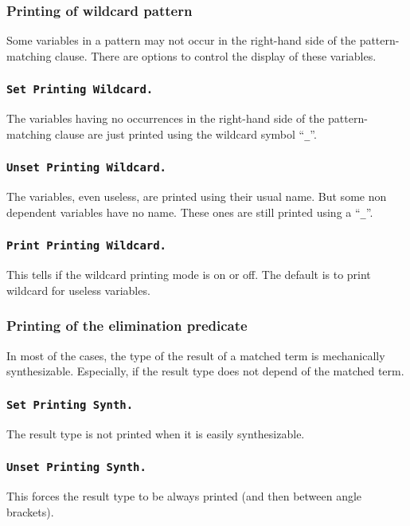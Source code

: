 \subsubsection{Printing of wildcard pattern}

Some variables in a pattern may not occur in the right-hand side of
the pattern-matching clause.  There are options to control the
display of these variables.

\subsubsection{\tt Set Printing Wildcard.}
 The variables having no occurrences
in the right-hand side of the pattern-matching clause are just
printed using the wildcard symbol ``{\tt \_}''.

\subsubsection{\tt Unset Printing Wildcard.}
The variables, even useless, are printed using their usual name. But some
non dependent variables have no name. These ones are still printed
using a ``{\tt \_}''.

\subsubsection{\tt Print Printing Wildcard.}
This tells if the wildcard
printing mode is on or off. The default is to print wildcard for
useless variables.

\subsubsection{Printing of the elimination predicate}

In most of the cases, the type of the result of a matched term is
mechanically synthesizable. Especially, if the result type does not
depend of the matched term.

\subsubsection{\tt Set Printing Synth.}
The result type is not printed
when it is easily synthesizable.

\subsubsection{\tt Unset Printing Synth.}
This forces the result type to be always printed (and then between
angle brackets).

